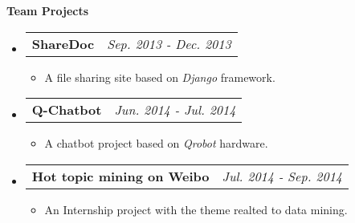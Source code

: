 \documentclass[letterpaper,11pt]{article}
\makeatletter
\newcommand{\resitem}[1]{\item #1 \vspace{-2pt}}
\newcommand{\resheading}[1]{{\large \colorbox{mygrey}{\begin{minipage}{\textwidth}{\textbf{#1 \vphantom{p\^{E}}}}\end{minipage}}}}
\newcommand{\projectsubheading}[2]{
\begin{tabular*}{7.0in}{l@{\extracolsep{\fill}}r}
		\textbf{#1} & \textit{#2} \\
\end{tabular*}\vspace{-6pt}}
\makeatother
\begin{document}
\resheading{Team Projects}
\begin{itemize}
\item
  \projectsubheading{ShareDoc}{Sep. 2013 - Dec. 2013}
    \begin{itemize}
      \resitem{A file sharing site based on \textit{Django} framework.}
    \end{itemize}

\item
  \projectsubheading{Q-Chatbot}{Jun. 2014 - Jul. 2014}
    \begin{itemize}
      \resitem{A chatbot project based on \textit{Qrobot} hardware.}
    \end{itemize}

\item
  \projectsubheading{Hot topic mining on Weibo}{Jul. 2014 - Sep. 2014}
    \begin{itemize}
      \resitem{An Internship project with the theme realted to data mining.}
    \end{itemize}

\end{itemize}
\end{document}
